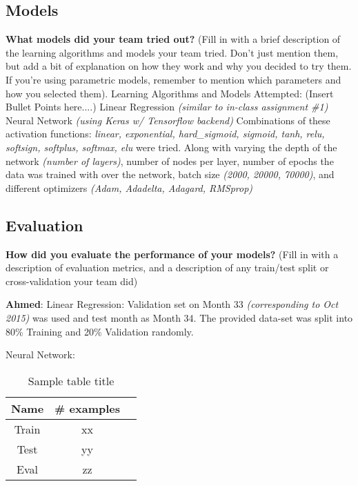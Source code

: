 \documentclass{article}
\begin{document}
\subsection{Models}
\textbf{What models did your team tried out?}
(Fill in with a brief description of the learning algorithms and models your team tried. Don't just mention them, but add a bit of explanation on how they work and why you decided to try them. If you're using parametric models, remember to mention which parameters and how you selected them). \newline \newline
Learning Algorithms and Models Attempted: \newline
(Insert Bullet Points here....) \newline
Linear Regression \textit{(similar to in-class assignment \#1)}\newline
Neural Network \textit{(using Keras w/ Tensorflow backend)}\newline
Combinations of these activation functions: \textit{linear, exponential, hard\_sigmoid, sigmoid, tanh, relu, softsign, softplus, softmax, elu} were tried. Along with varying the depth of the network \textit{(number of layers)}, number of nodes per layer, number of epochs the data was trained with over the network, batch size \textit{(2000, 20000, 70000)}, and different optimizers \textit{(Adam, Adadelta, Adagard, RMSprop)}


\subsection{Evaluation}
\textbf{How did you evaluate the performance of your models?}
(Fill in with a description of evaluation metrics, and a description of any train/test split or cross-validation your team did)

\textbf{Ahmed}:\newline
Linear Regression:
Validation set on Month 33 \textit{(corresponding to Oct 2015)} was used and test month as Month 34. \newline
The provided data-set was split into 80\% Training and 20\% Validation randomly.\newline

Neural Network:


\begin{table}
  \caption{Sample table title}
  \label{sample-table}
  \centering
  \begin{tabular}{ccc}
    Name & \# examples\\\hline
    Train & xx \\
    Test & yy \\
    Eval & zz \\
  \end{tabular}
\end{table}
\end{document}
